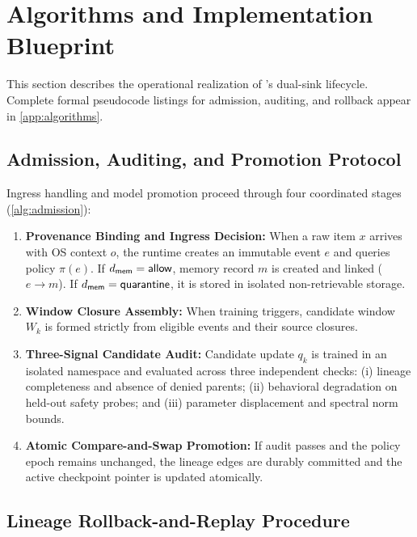 \section{Algorithms and Implementation Blueprint}
\label{sec:algorithms}

This section describes the operational realization of \PG{}'s dual-sink lifecycle. Complete formal pseudocode listings for admission, auditing, and rollback appear in \cref{app:algorithms}.

\subsection{Admission, Auditing, and Promotion Protocol}

Ingress handling and model promotion proceed through four coordinated stages (\cref{alg:admission}):
\begin{enumerate}[leftmargin=*,itemsep=1pt]
  \item \textbf{Provenance Binding and Ingress Decision:} When a raw item $x$ arrives with OS context $o$, the runtime creates an immutable event $e$ and queries policy $\pi(e)$. If $d_{\mathsf{mem}}=\mathsf{allow}$, memory record $m$ is created and linked ($e\rightarrow m$). If $d_{\mathsf{mem}}=\mathsf{quarantine}$, it is stored in isolated non-retrievable storage.
  \item \textbf{Window Closure Assembly:} When training triggers, candidate window $W_k$ is formed strictly from eligible events and their source closures.
  \item \textbf{Three-Signal Candidate Audit:} Candidate update $q_k$ is trained in an isolated namespace and evaluated across three independent checks: (i) lineage completeness and absence of denied parents; (ii) behavioral degradation on held-out safety probes; and (iii) parameter displacement and spectral norm bounds.
  \item \textbf{Atomic Compare-and-Swap Promotion:} If audit passes and the policy epoch remains unchanged, the lineage edges are durably committed and the active checkpoint pointer is updated atomically.
\end{enumerate}

\subsection{Lineage Rollback-and-Replay Procedure}

